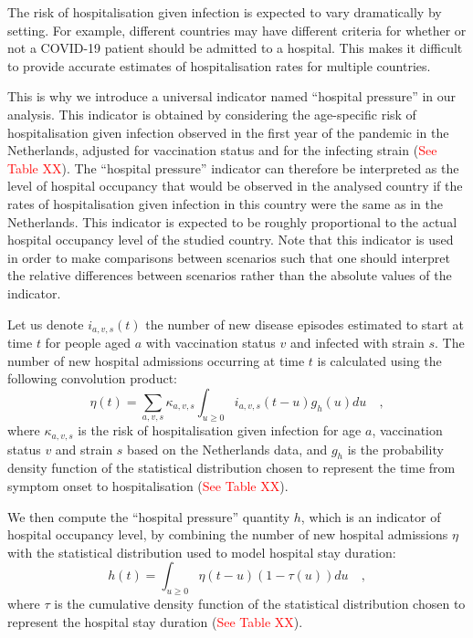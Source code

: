 The risk of hospitalisation given infection is expected to vary dramatically by setting.
For example, different countries may have different criteria for whether or not a COVID-19 
patient should be admitted to a hospital. This makes it difficult to provide accurate 
estimates of hospitalisation rates for multiple countries. 

This is why we introduce a universal indicator named ``hospital pressure'' in our analysis. This indicator
is obtained by considering the age-specific risk of hospitalisation given infection observed in the first year
of the pandemic in the Netherlands, adjusted for vaccination status and for the infecting strain (\textcolor{red}{See Table XX}).
The ``hospital pressure'' indicator can therefore be interpreted as the level of hospital occupancy that
would be observed in the analysed country if the rates of hospitalisation given infection in this country were the same
as in the Netherlands. This indicator is expected to be roughly proportional to the actual hospital occupancy level of the 
studied country. Note that this indicator is used in order to make comparisons between scenarios such that one should interpret the relative
differences between scenarios rather than the absolute values of the indicator. 

Let us denote $i_{a,v,s}(t)$ the number of new disease episodes estimated to start at time $t$ for people aged $a$ with vaccination status $v$
and infected with strain $s$. The number of new hospital admissions occurring at time $t$ is calculated using the following
convolution product:
\begin{equation}
 \eta(t) = \sum_{a,v,s} \kappa_{a,v,s} \int_{u \geq 0}  i_{a,v,s}(t-u)g_{h}(u) du   \quad,
 \end{equation}
where $\kappa_{a,v,s}$ is the risk of hospitalisation given infection for age $a$, vaccination status $v$ and strain $s$ 
based on the Netherlands data, and $g_h$ is the probability density function of the statistical distribution chosen to represent the 
time from symptom onset to hospitalisation (\textcolor{red}{See Table XX}). 

We then compute the ``hospital pressure'' quantity $h$, which is an indicator of hospital occupancy level, by combining the number of new 
hospital admissions $\eta$ with the statistical distribution used to model hospital stay duration:
\begin{equation}
h(t) = \int_{u \geq 0}  \eta(t-u) (1 - \tau(u)) du   \quad,
\end{equation}
where $\tau$ is the cumulative density function of the statistical distribution chosen to represent the 
hospital stay duration (\textcolor{red}{See Table XX}). 
